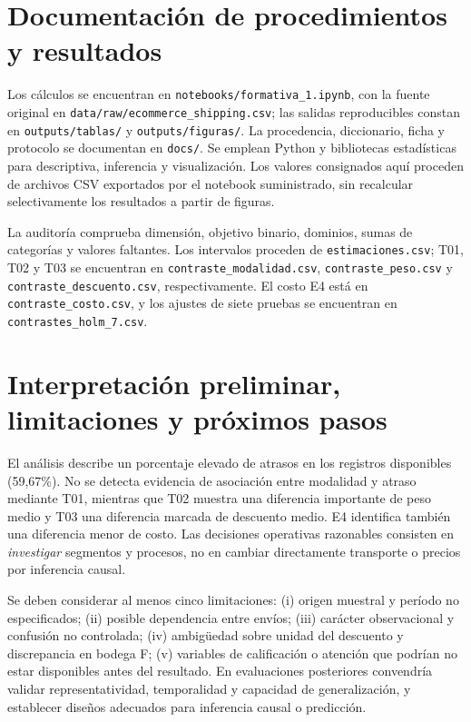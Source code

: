 \documentclass[11pt,a4paper]{article}
\begin{document}
\section{Documentación de procedimientos y resultados}
Los cálculos se encuentran en \texttt{notebooks/formativa\_1.ipynb}, con la fuente original en \texttt{data/raw/ecommerce\_shipping.csv}; las salidas reproducibles constan en \texttt{outputs/tablas/} y \texttt{outputs/figuras/}. La procedencia, diccionario, ficha y protocolo se documentan en \texttt{docs/}. Se emplean Python y bibliotecas estadísticas para descriptiva, inferencia y visualización. Los valores consignados aquí proceden de archivos CSV exportados por el notebook suministrado, sin recalcular selectivamente los resultados a partir de figuras.

La auditoría comprueba dimensión, objetivo binario, dominios, sumas de categorías y valores faltantes. Los intervalos proceden de \texttt{estimaciones.csv}; T01, T02 y T03 se encuentran en \texttt{contraste\_modalidad.csv}, \texttt{contraste\_peso.csv} y \texttt{contraste\_descuento.csv}, respectivamente. El costo E4 está en \texttt{contraste\_costo.csv}, y los ajustes de siete pruebas se encuentran en \texttt{contrastes\_holm\_7.csv}.

\section{Interpretación preliminar, limitaciones y próximos pasos}
El análisis describe un porcentaje elevado de atrasos en los registros disponibles (59,67\%). No se detecta evidencia de asociación entre modalidad y atraso mediante T01, mientras que T02 muestra una diferencia importante de peso medio y T03 una diferencia marcada de descuento medio. E4 identifica también una diferencia menor de costo. Las decisiones operativas razonables consisten en \emph{investigar} segmentos y procesos, no en cambiar directamente transporte o precios por inferencia causal.

Se deben considerar al menos cinco limitaciones: (i) origen muestral y período no especificados; (ii) posible dependencia entre envíos; (iii) carácter observacional y confusión no controlada; (iv) ambigüedad sobre unidad del descuento y discrepancia en bodega F; (v) variables de calificación o atención que podrían no estar disponibles antes del resultado. En evaluaciones posteriores convendría validar representatividad, temporalidad y capacidad de generalización, y establecer diseños adecuados para inferencia causal o predicción.
\end{document}
